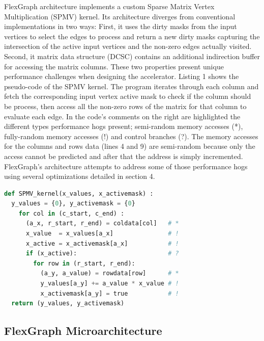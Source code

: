 FlexGraph architecture implements a custom Sparse Matrix Vertex Multiplication (SPMV) kernel. Its architecture diverges from conventional implementations in two ways: First, it uses the dirty masks from  the input vertices to select the edges to process and return a new dirty masks capturing the intersection of the active input vertices and the non-zero edges actually visited. Second, it matrix data structure (DCSC) contains an additional indirection buffer for accessing the matrix columns. These two properties present unique performance challenges when designing the accelerator. Listing 1 shows the pseudo-code of the SPMV kernel. The program iterates through each column and fetch the corresponding input vertex active mask to check if the column should be process, then access all the non-zero rows of the matrix for that column to evaluate each edge. In the code's comments on the right are highlighted the different types performance hogs present; semi-random memory accesses (*), fully-random memory accesses (!) and control branches (?). The memory accesses for the columns and rows data (lines 4 and 9) are semi-random because only the access cannot be predicted and after that the address is simply incremented. FlexGraph's architecture attempts to address some of those performance hogs using several optimizations detailed in section 4.

\begin{lstlisting}[language=Python, caption=Pseudo-code for SPMV kernel]
def SPMV_kernel(x_values, x_activemask) :
  y_values = {0}, y_activemask = {0}
    for col in (c_start, c_end) :            	
      (a_x, r_start, r_end) = coldata[col]   # *
      x_value  = x_values[a_x]               # !
      x_active = x_activemask[a_x]           # !
      if (x_active):                         # ?
        for row in (r_start, r_end):         
          (a_y, a_value) = rowdata[row]      # *
          y_values[a_y] += a_value * x_value # !
          x_activemask[a_y] = true           # !
  return (y_values, y_activemask)
\end{lstlisting}

\subsection{FlexGraph Microarchitecture}

